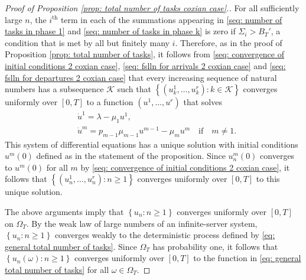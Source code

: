 \documentclass[a4paper, 12pt]{article}
\theoremstyle{definition}
\newcommand{\set}[2]{\left\{#1 : #2\right\}}
\newcommand{\calK}{\mathcal{K}}
\begin{document}
\begin{appendices}
\begin{proof}[Proof of Proposition \ref{prop: total number of tasks coxian case}.]
	For all sufficiently large $n$, the $i^{\text{th}}$ term in each of the summations appearing in \eqref{seq: number of tasks in phase 1} and \eqref{seq: number of tasks in phase k} is zero if $\Sigma_i > B_T'$, a condition that is met by all but finitely many $i$. Therefore, as in the proof of Proposition \ref{prop: total number of tasks}, it follows from \eqref{seq: convergence of initial conditions 2 coxian case}, \eqref{seq: fslln for arrivals 2 coxian case} and \eqref{seq: fslln for departures 2 coxian case} that every increasing sequence of natural numbers has a subsequence $\calK$ such that $\set{(u_k^1, \dots, u_k^r)}{k \in \calK}$ converges uniformly over $[0, T]$ to a function $(u^1, \dots, u^r)$ that solves
	\begin{align*}
		&\dot{u}^1 = \lambda - \mu_1u^1, \\
		&\dot{u}^m = p_{m - 1}\mu_{m - 1}u^{m - 1} - \mu_m u^m \quad \text{if} \quad m \neq 1.
	\end{align*}
	This system of differential equations has a unique solution with initial conditions $u^m(0)$ defined as in the statement of the proposition. Since $u_n^m(0)$ converges to $u^m(0)$ for all $m$ by \eqref{seq: convergence of initial conditions 2 coxian case}, it follows that $\set{(u_n^1, \dots, u_n^r)}{n \geq 1}$ converges uniformly over $[0, T]$ to this unique solution.
	
	The above arguments imply that $\set{u_n}{n \geq 1}$ converges uniformly over $[0, T]$ on $\Omega_T$. By the weak law of large numbers of an infinite-server system, $\set{u_n}{n \geq 1}$ converges weakly to the deterministic process defined by \eqref{eq: general total number of tasks}. Since $\Omega_T$ has probability one, it follows that $\set{u_n(\omega)}{n \geq 1}$ converges uniformly over $[0, T]$ to the function in \eqref{eq: general total number of tasks} for all $\omega \in \Omega_T$.
	\end{proof}
	
\end{appendices}
	
\newcommand{\noop}[1]{}


	
\end{document}
